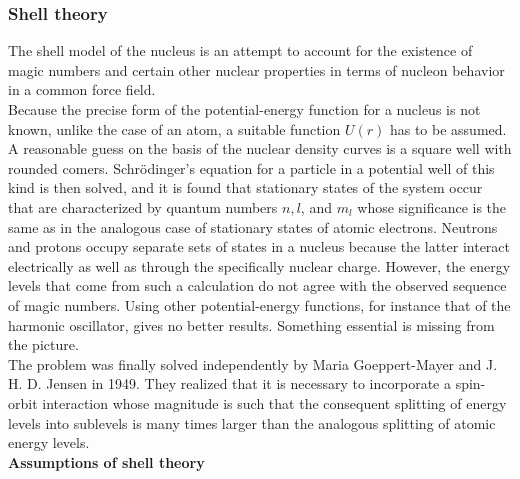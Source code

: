 	\subsubsection{Shell theory}
	The shell model of the nucleus is an attempt to account for the existence of magic numbers and certain other nuclear properties in terms of nucleon behavior in a common force field.\\
	Because the precise form of the potential-energy function for a nucleus is not known, unlike the case of an atom, a suitable function $U(r)$ has to be assumed. A reasonable guess on the basis of the nuclear density curves is a square well with rounded comers. Schrödinger's equation for a particle in a potential well of this kind is then solved, and it is found that stationary states of the system occur that are characterized by quantum numbers $n, l$, and $m_{l}$ whose significance is the same as in the analogous case of stationary states of atomic electrons. Neutrons and protons occupy separate sets of states in a nucleus because the latter interact electrically as well as through the specifically nuclear charge. However, the energy levels that come from such a calculation do not agree with the observed sequence of magic numbers. Using other potential-energy functions, for instance that of the harmonic oscillator, gives no better results. Something essential is missing from the picture.\\
	The problem was finally solved independently by Maria Goeppert-Mayer and J. H. D. Jensen in 1949. They realized that it is necessary to incorporate a spin-orbit interaction whose magnitude is such that the consequent splitting of energy levels into sublevels is many times larger than the analogous splitting of atomic energy levels.\\
	\textbf{Assumptions of shell theory}
